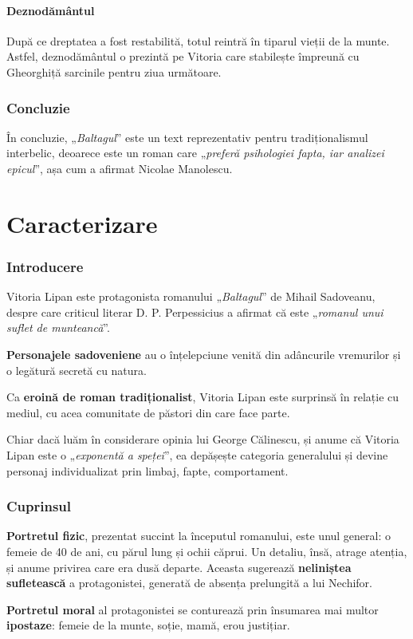 \documentclass{article}
\newcommand{\qu}[1]{„\emph{#1}”}
\begin{document}
\subsection{Deznodământul}
După ce dreptatea a fost restabilită, totul reintră în tiparul vieții de la munte. Astfel, deznodământul o prezintă pe Vitoria care stabilește împreună cu Gheorghiță sarcinile pentru ziua următoare.
\section{Concluzie}
În concluzie, \qu{Baltagul} este un text reprezentativ pentru tradiționalismul interbelic, deoarece este un roman care \qu{preferă psihologiei fapta, iar analizei epicul}, așa cum a afirmat Nicolae Manolescu.

\part*{Caracterizare}
\setcounter{section}{0}
\section{Introducere}
Vitoria Lipan este protagonista romanului \qu{Baltagul} de Mihail Sadoveanu, despre care criticul literar D. P. Perpessicius a afirmat că este \qu{romanul unui suflet de munteancă}.

\textbf{Personajele sadoveniene} au o înțelepciune venită din adâncurile vremurilor și o legătură secretă cu natura.

Ca \textbf{eroină de roman tradiționalist}, Vitoria Lipan este surprinsă în relație cu mediul, cu acea comunitate de păstori din care face parte.

Chiar dacă luăm în considerare opinia lui George Călinescu, și anume că Vitoria Lipan este o \qu{exponentă a speței}, ea depășește categoria generalului și devine personaj individualizat prin limbaj, fapte, comportament.
\section{Cuprinsul}
\textbf{Portretul fizic}, prezentat succint la începutul romanului, este unul general: o femeie de 40 de ani, cu părul lung și ochii căprui. Un detaliu, însă, atrage atenția, și anume privirea care era dusă departe. Aceasta sugerează \textbf{neliniștea sufletească} a protagonistei, generată de absența prelungită a lui Nechifor.

\textbf{Portretul moral} al protagonistei se conturează prin însumarea mai multor \textbf{ipostaze}: femeie de la munte, soție, mamă, erou justițiar.
\end{document}
